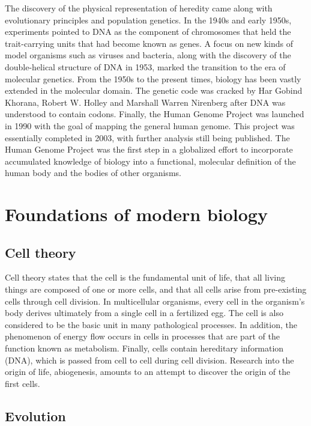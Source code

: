 \documentclass[
]{book}
\begin{document}
The discovery of the physical representation of heredity came along with evolutionary principles and population genetics. In the 1940s and early 1950s, experiments pointed to DNA as the component of chromosomes that held the trait-carrying units that had become known as genes. A focus on new kinds of model organisms such as viruses and bacteria, along with the discovery of the double-helical structure of DNA in 1953, marked the transition to the era of molecular genetics. From the 1950s to the present times, biology has been vastly extended in the molecular domain. The genetic code was cracked by Har Gobind Khorana, Robert W. Holley and Marshall Warren Nirenberg after DNA was understood to contain codons. Finally, the Human Genome Project was launched in 1990 with the goal of mapping the general human genome. This project was essentially completed in 2003, with further analysis still being published. The Human Genome Project was the first step in a globalized effort to incorporate accumulated knowledge of biology into a functional, molecular definition of the human body and the bodies of other organisms.

\hypertarget{foundations-of-modern-biology}{%
\section{Foundations of modern biology}\label{foundations-of-modern-biology}}

\hypertarget{cell-theory}{%
\subsection{Cell theory}\label{cell-theory}}

Cell theory states that the cell is the fundamental unit of life, that all living things are composed of one or more cells, and that all cells arise from pre-existing cells through cell division. In multicellular organisms, every cell in the organism's body derives ultimately from a single cell in a fertilized egg. The cell is also considered to be the basic unit in many pathological processes. In addition, the phenomenon of energy flow occurs in cells in processes that are part of the function known as metabolism. Finally, cells contain hereditary information (DNA), which is passed from cell to cell during cell division. Research into the origin of life, abiogenesis, amounts to an attempt to discover the origin of the first cells.

\hypertarget{evolution}{%
\subsection{Evolution}\label{evolution}}
\end{document}
